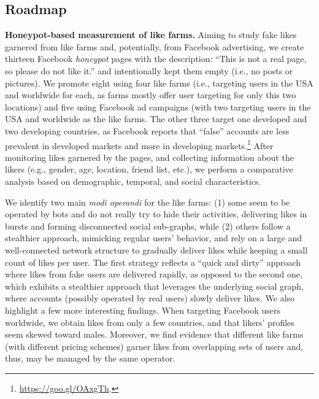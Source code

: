 \documentclass[twocolumn,10pt,letterpaper]{article}
\newcommand{\descr}[1]{\smallskip\noindent\textbf{#1}}
\begin{document}
\subsection{Roadmap}
%
\descr{Honeypot-based measurement of like farms.} Aiming to study fake likes garnered from like farms and, potentially, from Facebook advertising, we create thirteen Facebook {\em honeypot} pages with the description: ``This is not a real page, so please do not like it.'' and intentionally kept them empty  (i.e.,  no posts or pictures). We promote eight using four like farms (i.e., targeting users in the USA and worldwide for each, as farms mostly offer user targeting for only this two locations) and five using Facebook ad campaigns (with two targeting users in the USA and worldwide as the like farms. The other three target one developed and two developing countries, as Facebook reports that ``false'' accounts are less prevalent in developed markets and
more in developing markets.\footnote{\url{https://goo.gl/OAxgTh}.}
After monitoring likes garnered by the pages, and collecting information about the likers
(e.g., gender, age, location, friend list, etc.), we perform a comparative analysis based on demographic, temporal, and social characteristics.

We identify two main {\em modi operandi} for the like farms: (1) some seem to be  operated by bots and do not really try to hide their activities, delivering likes in bursts and forming disconnected social sub-graphs, while (2) others follow a stealthier approach, mimicking regular users' behavior, and rely on a large and well-connected network structure to gradually deliver likes while keeping a small count of likes per user. The first strategy reflects a ``quick and dirty'' approach where likes from fake
users are delivered rapidly, as opposed to the second one,  which exhibits a stealthier approach that leverages the underlying social graph, where accounts (possibly operated by real users) slowly deliver likes.
%
We also highlight a few more interesting findings. When targeting Facebook users worldwide, we obtain likes from only a few countries, and that likers' profiles seem skewed toward males. Moreover, we find evidence that different like farms (with different pricing schemes) garner likes from overlapping sets of users and, thus, may be managed by the same operator.
\end{document}
